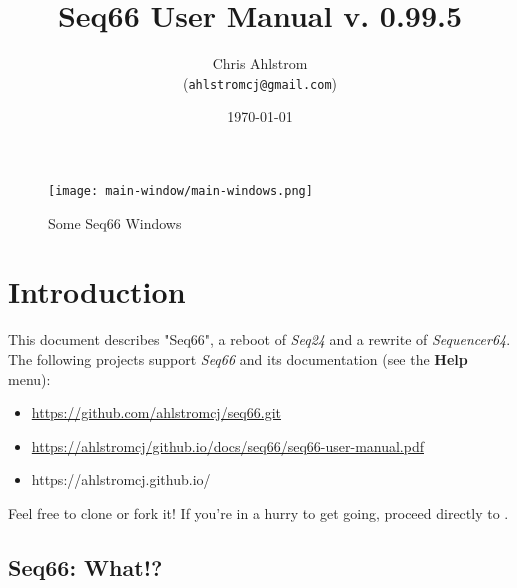 \documentclass[
 11pt,
 twoside,
 a4paper,
 final                                 %
]{article}
\begin{document}
\title{Seq66 User Manual v. 0.99.5}
\author{Chris Ahlstrom \\
   (\texttt{ahlstromcj@gmail.com})}
\date{\today}
\maketitle

\begin{figure}[H]
   \centering 
   \texttt{[image: main-window/main-windows.png]}
   \caption*{Some Seq66 Windows}
\end{figure}

\clearpage                             %

\tableofcontents
\listoffigures                         %
\listoftables                          %

%

\parindent 0pt
\parskip 9pt

\rhead{\rightmark}         %

\section{Introduction}
\label{sec:introduction}

   This document describes "Seq66", a reboot of \textsl{Seq24} and a rewrite of
   \textsl{Sequencer64}.
   The following projects support \textsl{Seq66} and its documentation (see
   the \textbf{Help} menu):

   \begin{itemize}
      \item \url{https://github.com/ahlstromcj/seq66.git}
      \item \url{https://ahlstromcj/github.io/docs/seq66/seq66-user-manual.pdf}
      \item https://ahlstromcj.github.io/
   \end{itemize}

   Feel free to clone or fork it!
   If you're in a hurry to get going, proceed directly to
   .

\subsection{Seq66: What!?}
\label{subsec:what_is_seq66}
\end{document}
